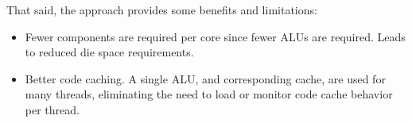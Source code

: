 That said, the approach provides some benefits and limitations:

\begin{itemize}
	\item Fewer components are required per core since fewer ALUs are required. Leads to reduced die space requirements.
	\item Better code caching. A single ALU, and corresponding cache, are used for many threads, eliminating the need to load or monitor code cache behavior per thread.
\end{itemize}





